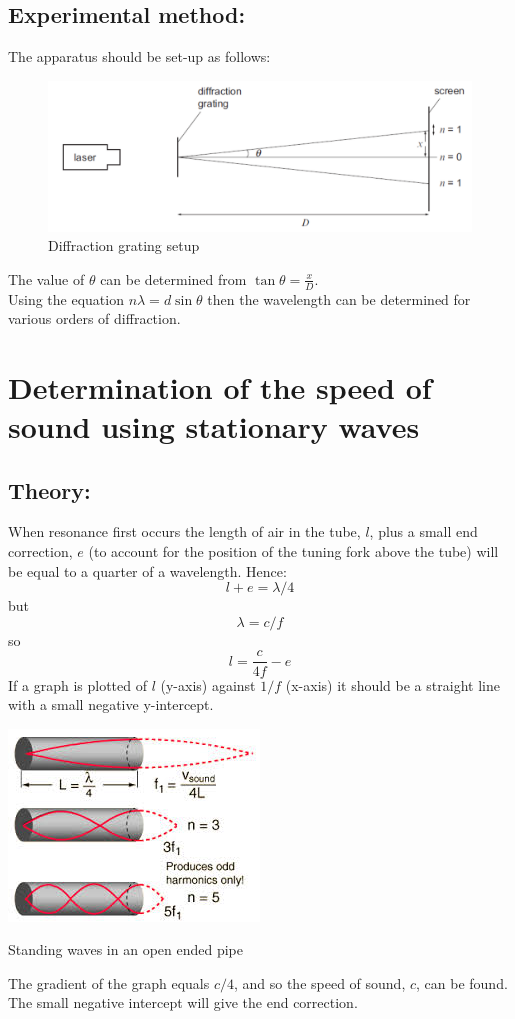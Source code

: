 \documentclass{tufte-handout}
\begin{document}
\subsection{Experimental method:} 
The apparatus should be set-up as follows:  
\begin{figure}
\includegraphics[width=\textwidth]{diffractiongrating.PNG}
\caption{Diffraction grating setup}
\end{figure}
The value of $\theta$ can be determined from $\tan \theta = \frac{x}{D}$. \\ 
Using the equation $n \lambda  =d\sin \theta$ then the wavelength can be determined for various orders of diffraction. 
\section{Determination of the speed of sound using stationary waves}
\subsection{Theory:} 
When resonance first occurs the length of air in the tube, $l$, plus a small end correction, $e$ (to account for the position of the tuning fork above the tube) will be equal to a quarter of a wavelength. Hence: 
\[l + e = \lambda/4 \] but \[ \lambda = c/f \] so   \[l = \frac{c}{4f}-e\] If a graph is plotted of $l$ (y-axis) against $1/f$ (x-axis) it should be a straight line with a small negative y-intercept. \begin{marginfigure}
\includegraphics[]{waves.jpg}
\caption{Standing waves in an open ended pipe}
\end{marginfigure}
The gradient of the graph equals $c/4$, and so the speed of sound, $c$, can be found. The small negative intercept will give the end correction. 
\end{document}
